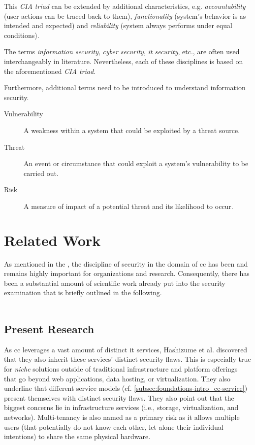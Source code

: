 	This \textit{CIA triad} can be extended by additional characteristics, e.g. \textit{accountability} (user actions can be traced back to them), \textit{functionality} (system's behavior is as intended and expected) and \textit{reliability} (system always performs under equal conditions). \cite[p. 36 sq.]{FischerHuebner2001}
		
	The terms \textit{information security}, \textit{cyber security}, \textit{\ac{it} security}, etc., are often used interchangeably in literature. Nevertheless, each of these disciplines is based on the aforementioned \textit{CIA triad}.
		
	Furthermore, additional terms need to be introduced to understand information security.
		
	\begin{description}
		\item[Vulnerability] A weakness within a system that could be exploited by a threat source. \cite{Nieles2017}
		\item[Threat] An event or circumstance that could exploit a system's vulnerability to be carried out. \cite{Nieles2017}
		\item[Risk] A measure of impact of a potential threat and its likelihood to occur. \cite{Nieles2017}
	\end{description}
		

\chapter{Related Work} 
\label{ch:related-work}
As mentioned in the , the discipline of security in the domain of \ac{cc} has been and remains highly important for organizations and research. Consequently, there has been a substantial amount of scientific work already put into the security examination that is briefly outlined in the following. \\\

\section{Present Research} \label{sec:related-work_present}

As \ac{cc} leverages a vast amount of distinct \ac{it} services, Hashizume et al. \cite{Hashizume2013} discovered that they also inherit these services' distinct security flaws. This is especially true for \textit{niche} solutions outside of traditional infrastructure and platform offerings that go beyond web applications, data hosting, or virtualization. They also underline that different service models (cf. \autoref{subsec:foundations-intro_cc-service}) present themselves with distinct security flaws. They also point out that the biggest concerns lie in infrastructure services (i.e., storage, virtualization, and networks). Multi-tenancy is also named as a primary risk as it allows multiple users (that potentially do not know each other, let alone their individual intentions) to share the same physical hardware.

